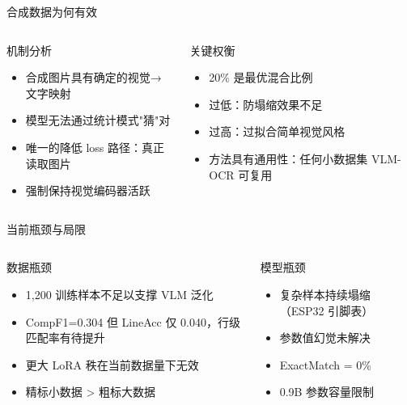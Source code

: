 \documentclass[10pt,aspectratio=169,table]{beamer}
\begin{document}
\begin{frame}{合成数据为何有效}
  \begin{columns}[T]
      \begin{block}{机制分析}
        \footnotesize
        \begin{itemize}
          \item 合成图片具有确定的视觉→文字映射
          \item 模型无法通过统计模式"猜"对
          \item 唯一的降低 loss 路径：真正读取图片
          \item 强制保持视觉编码器活跃
        \end{itemize}
      \end{block}
      \begin{block}{关键权衡}
        \footnotesize
        \begin{itemize}
          \item 20\% 是最优混合比例
          \item 过低：防塌缩效果不足
          \item 过高：过拟合简单视觉风格
          \item 方法具有通用性：任何小数据集 VLM-OCR 可复用
        \end{itemize}
      \end{block}
  \end{columns}
\end{frame}

\begin{frame}{当前瓶颈与局限}
  \begin{columns}[T]
      \begin{block}{数据瓶颈}
        \footnotesize
        \begin{itemize}
          \item 1,200 训练样本不足以支撑 VLM 泛化
          \item CompF1=0.304 但 LineAcc 仅 0.040，行级匹配率有待提升
          \item 更大 LoRA 秩在当前数据量下无效
          \item 精标小数据 > 粗标大数据
        \end{itemize}
      \end{block}
      \begin{block}{模型瓶颈}
        \footnotesize
        \begin{itemize}
          \item 复杂样本持续塌缩（ESP32 引脚表）
          \item 参数值幻觉未解决
          \item ExactMatch = 0\%
          \item 0.9B 参数容量限制
        \end{itemize}
      \end{block}
  \end{columns}
\end{frame}
\end{document}
